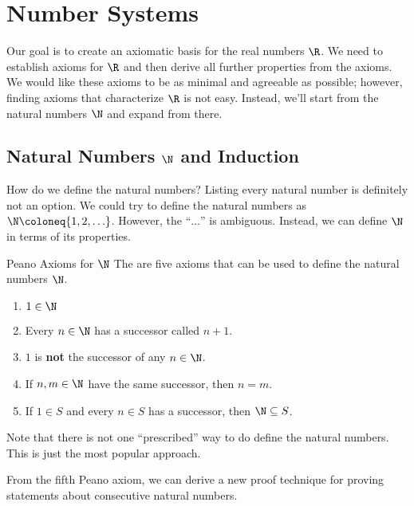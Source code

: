 \chapter{Number Systems}
Our goal is to create an axiomatic basis for the real numbers $\R$. We need to establish axioms for $\R$ and then derive all further properties from the axioms. We would like these axioms to be as minimal and agreeable as possible; however, finding axioms that characterize $\R$ is not easy. Instead, we'll start from the natural numbers $\N$ and expand from there.

\section{Natural Numbers $\N$ and Induction}
How do we define the natural numbers? Listing every natural number is definitely not an option. We could try to define the natural numbers as $\N \coloneq \{ 1, 2, \ldots \}$. However, the ``$\ldots$'' is ambiguous. Instead, we can define $\N$ in terms of its properties.

\begin{dfnbox}{Peano Axioms for $\N$}{}
    The  are five axioms that can be used to define the natural numbers $\N$.
    \begin{enumerate}[noitemsep]
        \item $1 \in \N$
        \item Every $n \in \N$ has a successor called $n+1$.
        \item $1$ is \textbf{not} the successor of any $n \in \N$.
        \item If $n,m \in \N$ have the same successor, then $n = m$.
        \item If $1 \in S$ and every $n \in S$ has a successor, then $\N \subseteq S$.
    \end{enumerate}
\end{dfnbox}

\begin{notebox}
    Note that there is not one ``prescribed'' way to do define the natural numbers. This is just the most popular approach.
\end{notebox}

From the fifth Peano axiom, we can derive a new proof technique for proving statements about consecutive natural numbers.


